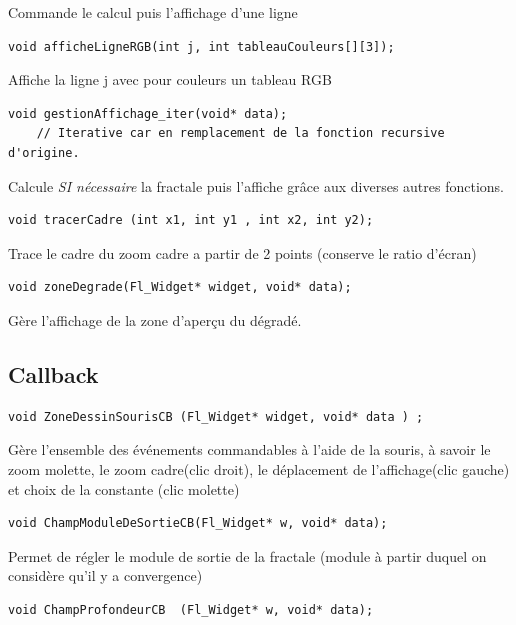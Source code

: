 \documentclass[a4paper,11pt]{article} \usepackage[T1]{fontenc} \usepackage[utf8]{inputenc} \usepackage[francais]{babel}
\begin{document}
Commande le calcul puis l'affichage d'une ligne

\begin{lstlisting}
void afficheLigneRGB(int j, int tableauCouleurs[][3]);\end{lstlisting}

Affiche la ligne j avec pour couleurs un tableau RGB

\begin{lstlisting}
void gestionAffichage_iter(void* data);
    // Iterative car en remplacement de la fonction recursive d'origine.\end{lstlisting}

Calcule \emph{SI nécessaire} la fractale puis l'affiche grâce aux diverses autres fonctions.

\begin{lstlisting}
void tracerCadre (int x1, int y1 , int x2, int y2);\end{lstlisting}

Trace le cadre du zoom cadre a partir de 2 points (conserve le ratio d'écran)

\begin{lstlisting}
void zoneDegrade(Fl_Widget* widget, void* data);\end{lstlisting}

Gère l'affichage de la zone d’aperçu du dégradé.\\

\subsection{Callback}
\begin{lstlisting}
void ZoneDessinSourisCB (Fl_Widget* widget, void* data ) ;\end{lstlisting}

Gère l'ensemble des événements commandables à l'aide de la souris, à savoir le zoom molette, le zoom cadre(clic droit), le déplacement de l'affichage(clic gauche) et choix de la constante (clic molette)

\begin{lstlisting}
void ChampModuleDeSortieCB(Fl_Widget* w, void* data);\end{lstlisting}

Permet de régler le module de sortie de la fractale (module à partir duquel on considère qu'il y a convergence)

\begin{lstlisting}
void ChampProfondeurCB  (Fl_Widget* w, void* data);\end{lstlisting}
\end{document}

